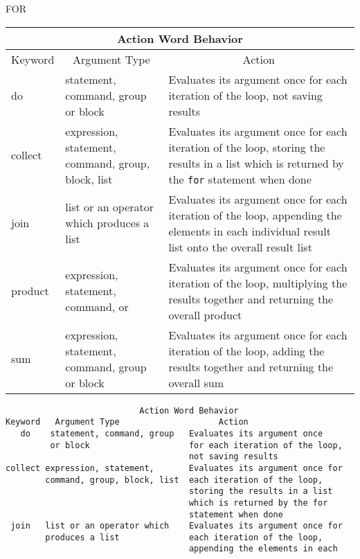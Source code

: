 \begin{Command}{FOR}
\begin{Comments}
\begin{TEX}
\begin{center}
\begin{tabular}{|l|p{5cm}|p{5cm}|}
\hline
\multicolumn{3}{|c|}{Action Word Behavior}\\
\hline
\multicolumn{1}{|c|}{Keyword} &
   \multicolumn{1}{c|}{Argument Type} & \multicolumn{1}{c|}{Action} \\
\hline
do & statement, command, group or block &
Evaluates its argument once for each iteration of the loop, not saving
results \\
collect & expression, statement, command, group, block, list &
Evaluates its argument once for each iteration of the loop, storing the results
in a list which is returned by the \verb|for| statement when done \\
join & list or an operator which produces a list &
Evaluates its argument once for each iteration of the loop, appending the
elements in each individual result list onto the overall result list \\
product & expression, statement, command, 
\nameref{group} or \nameref{block} &
Evaluates its argument once for each iteration of the loop, multiplying the
results together and returning the overall product \\
sum & expression, statement, command, group or block &
Evaluates its argument once for each iteration of the loop, adding the results
together and returning the overall sum\\
\hline
\end{tabular}
\end{center}
\end{TEX}
\begin{INFO}
{\begin{verbatim}
                           Action Word Behavior
Keyword   Argument Type                    Action
   do    statement, command, group   Evaluates its argument once
         or block                    for each iteration of the loop,
                                     not saving results
collect expression, statement,       Evaluates its argument once for
        command, group, block, list  each iteration of the loop,
                                     storing the results in a list
                                     which is returned by the for
                                     statement when done
 join   list or an operator which    Evaluates its argument once for
        produces a list              each iteration of the loop,
                                     appending the elements in each

\end{verbatim}}
\end{INFO}
\end{Comments}
\end{Command}
